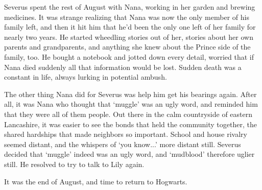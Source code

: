 \documentclass[a4paper,11pt]{article}
\begin{document}
Severus spent the rest of August with Nana, working in her garden and brewing medicines. It was strange realizing that Nana was now the only member of his family left, and then it hit him that he'd been the only one left of her family for nearly two years. He started wheedling stories out of her, stories about her own parents and grandparents, and anything she knew about the Prince side of the family, too. He bought a notebook and jotted down every detail, worried that if Nana died suddenly all that information would be lost. Sudden death was a constant in life, always lurking in potential ambush.

The other thing Nana did for Severus was help him get his bearings again. After all, it was Nana who thought that `muggle' was an ugly word, and reminded him that they were all of them people. Out there in the calm countryside of eastern Lancashire, it was easier to see the bonds that held the community together, the shared hardships that made neighbors so important. School and house rivalry seemed distant, and the whispers of `you know...' more distant still. Severus decided that `muggle' indeed was an ugly word, and `mudblood' therefore uglier still. He resolved to try to talk to Lily again.

It was the end of August, and time to return to Hogwarts.
\end{document}
